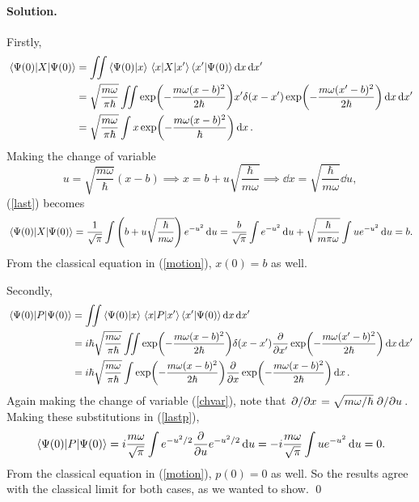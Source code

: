 \documentclass[11pt]{article}
\newcommand{\refeq}[1]{(\ref{#1})}
\newenvironment{solution}
{
    \paragraph{Solution.}
    \ignorespaces
}
{
}
\begin{document}
\begin{solution}
	Firstly,
	\begin{align}
		\ev{X}{\Psio} &= \iint \braket{\Psio}{x} \mel{x}{X}{x'} \braket{x'}{\Psio} \dd{x} \dd{x'} \\
		&= \sqrt{\frac{m \omega}{\pi \hbar}} \iint \exp(-\frac{m \omega (x - b)^2}{2 \hbar}) x' \delta(x - x') \exp(-\frac{m \omega (x' - b)^2}{2 \hbar}) \dd{x} \dd{x'} \\
		&= \sqrt{\frac{m \omega}{\pi \hbar}} \int x \exp(-\frac{m \omega (x - b)^2}{\hbar}) \dd{x}. \label{last}
	\end{align}
	Making the change of variable
	\begin{equation} \label{chvar}
		u = \sqrt{\frac{m\omega}{\hbar}} (x - b) \implies x = b + u \sqrt{\frac{\hbar}{m\omega}} \implies \dd{x} = \sqrt{\frac{\hbar}{m\omega}} \dd{u}, 
	\end{equation}
	\refeq{last} becomes
	\begin{equation} \label{expx}
		\ev{X}{\Psio} = \frac{1}{\sqrt{\pi}} \int \left(b + u \sqrt{\frac{\hbar}{m\omega}} \right) e^{-u^2} \dd{u} = \frac{b}{\sqrt{\pi}} \int e^{-u^2} \dd{u} + \sqrt{\frac{\hbar}{m \pi \omega}} \int u e^{-u^2} \dd{u} = b.
	\end{equation}
	From the classical equation in \refeq{motion}, $x(0) = b$ as well.
	
	Secondly,
	\begin{align}
		\ev{P}{\Psio} &= \iint \braket{\Psio}{x} \mel{x}{P}{x'} \braket{x'}{\Psio} \dd{x} \dd{x'} \\
		&= \ihb \sqrt{\frac{m \omega}{\pi \hbar}} \iint \exp(-\frac{m \omega (x - b)^2}{2 \hbar}) \delta(x - x') \pdv{}{x'} \exp(-\frac{m \omega (x' - b)^2}{2 \hbar}) \dd{x} \dd{x'} \\
		&= \ihb \sqrt{\frac{m \omega}{\pi \hbar}} \int \exp(-\frac{m \omega (x - b)^2}{2 \hbar}) \pdv{}{x} \exp(-\frac{m \omega (x - b)^2}{2 \hbar}) \dd{x}. \label{lastp}
	\end{align}
	Again making the change of variable \refeq{chvar}, note that $\pdv*{}{x} = \sqrt{m\omega / \hbar} \pdv*{}{u}$.  Making these substitutions in \refeq{lastp}, 
	\begin{equation} \label{expp}
		\ev{P}{\Psio} = i \frac{m \omega}{\sqrt{\pi}} \int e^{-u^2/2} \pdv{}{u} e^{-u^2/2} \dd{u} = -i \frac{m \omega}{\sqrt{\pi}} \int u e^{-u^2} \dd{u} = 0.
	\end{equation}
	From the classical equation in \refeq{motion}, $p(0) = 0$ as well.  So the results agree with the classical limit for both cases, as we wanted to show. \qed
\end{solution}
\end{document}

